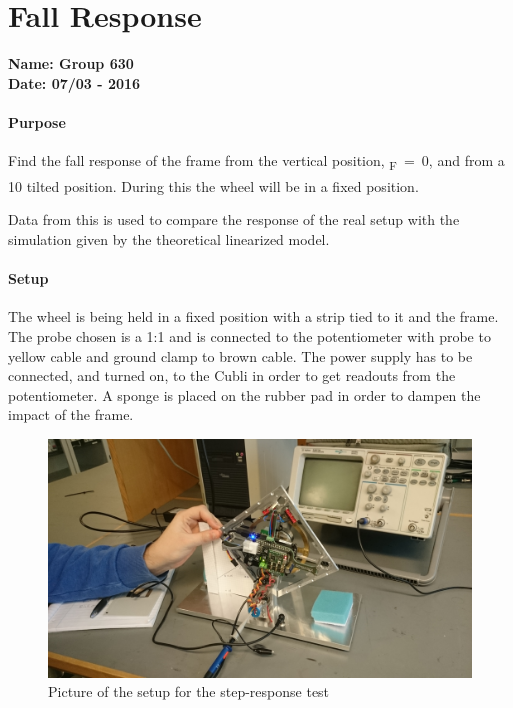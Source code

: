 \chapter{Fall Response}\label{comparisonLinModelReal} 
\textbf{Name: Group 630}\\
\textbf{Date: 07/03 - 2016}

\subsubsection{Purpose}
Find the fall response of the frame from the vertical position, \si{\theta_F=0}, and from a \si{10^\circ} tilted position. During this the wheel will be in a fixed position.

Data from this is used to compare the response of the real setup with the simulation given by the theoretical linearized model.

\subsubsection{Setup}
The wheel is being held in a fixed position with a strip tied to it and the frame. The probe chosen is a 1:1 and is connected to the potentiometer with probe to yellow cable and ground clamp to brown cable. The power supply has to be connected, and turned on, to the Cubli in order to get readouts from the potentiometer. A sponge is placed on the rubber pad in order to dampen the impact of the frame.
\begin{figure}[H]                                   
	\centering                                        
	\includegraphics[scale=0.08]{figures/stepResponseSetup}
	\caption{Picture of the setup for the step-response test}
	\label{stepResponseTestPicture} 
\end{figure}              

